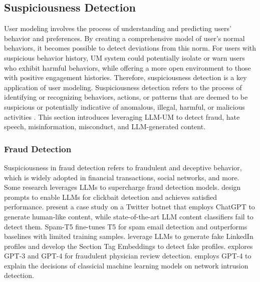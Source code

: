 \documentclass[11pt]{article}
\newcommand{\edit}[1]{\textcolor{blue}{#1}}
\newcommand{\comments}[1]{\textcolor{red}{[Re:~#1]}}
\begin{document}
\subsection{Suspiciousness Detection}
\label{sec:app_suspicious}
User modeling involves the process of understanding and predicting users' behavior and preferences. By creating a comprehensive model of user's normal behaviors, it becomes possible to detect deviations from this norm. For users with suspicious behavior history, UM system could potentially isolate or warn users who exhibit harmful behaviors, while offering a more open environment to those with positive engagement histories. Therefore, suspiciousness detection is a key application of user modeling.
Suspiciousness detection refers to the process of identifying or recognizing behaviors, actions, or patterns that are deemed to be suspicious or potentially indicative of anomalous, illegal, harmful, or malicious activities \cite{zhao2021action,jiang2014detecting,jiang2014catchsync}. 
This section introduces leveraging LLM-UM to detect fraud, hate speech, misinformation, misconduct, and LLM-generated content. 

\subsubsection{Fraud Detection}
\label{sec:sus_fraud}
Suspiciousness in fraud detection refers to fraudulent and deceptive behavior, which is widely adopted in financial transactions, social networks, and more. Some research leverages LLMs to supercharge fraud detection models. \cite{zhu2023clickbait} design prompts to enable LLMs for clickbait detection and achieves satisfied performance. \citet{yang2023anatomy} present a case study on a Twitter botnet that employs ChatGPT to generate human-like content, while state-of-the-art LLM content classifiers fail to detect them. Spam-T5 \cite{labonne2023spam} fine-tunes T5 for spam email detection and outperforms baselines with limited training samples. \citet{ayoobi2023looming} leverage LLMs to generate fake LinkedIn profiles and develop the Section Tag Embeddings to detect fake profiles. \citet{shukla2023catch} explores GPT-3 and GPT-4 for fraudulent physician review detection.
\citet{ziems2023explaining} employs GPT-4 to explain the decisions of classicial machine learning models on network intrusion detection.
\end{document}

